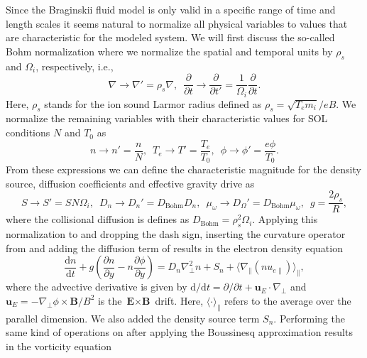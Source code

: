 Since the Braginskii fluid model is only valid in a specific range of time and length scales it seems natural to normalize all physical variables to values that are characteristic for the modeled system. We will first discuss the so-called Bohm normalization where we normalize the spatial and temporal units by $\rho_s$ and $\Omega_i$, respectively, i.e.,
\begin{equation}
	\nabla \rightarrow \nabla' = \rho_s\nabla, \,\,\, \frac{\partial}{\partial t} \rightarrow \frac{\partial}{\partial t'} = \frac{1}{\Omega_i}\frac{\partial}{\partial t}.
\end{equation}
Here, $\rho_s$ stands for the ion sound Larmor radius defined as $\rho_s = \sqrt{T_e m_i}/eB$.
We normalize the remaining variables with their characteristic values for SOL conditions $N$ and $T_0$ as
\begin{equation}
	n \rightarrow n' = \frac{n}{N},\,\,\, T_e \rightarrow T' = \frac{T_e}{T_0},\,\,\,\phi \rightarrow \phi' = \frac{e\phi}{T_0}. 
\end{equation}
From these expressions we can define the characteristic magnitude for the density source, diffusion coefficients and effective gravity drive as
\begin{equation}
	S\rightarrow S' = SN\Omega_i,\,\,\,D_n\rightarrow D_n' = D_{\textrm{Bohm}}D_n,\,\,\,\mu_\omega\rightarrow D_\Omega' = D_{\textrm{Bohm}}\mu_\omega,\,\,\,g = \frac{2\rho_s}{R},
\end{equation} 
where the collisional diffusion is defines as $D_{\textrm{Bohm}}= \rho_s^2\Omega_i$. Applying this normalization to  and dropping the dash sign, inserting the curvature operator from  and adding the diffusion term of  results in the electron density equation
\begin{equation}
	\frac{\mathrm{d}n}{\mathrm{d}t} + g \left(\frac{\partial n}{\partial y} - n\frac{\partial\phi}{\partial y}\right) = D_n \nabla_\perp^2 n + S_n + \Bigg \langle \nabla_\parallel \left(n{u}_{e\parallel} \right)\Bigg \rangle_\parallel,
\end{equation}
where the advective derivative is given by $\mathrm{d}/\mathrm{d}t = \partial/\partial t + \textbf{u}_E\cdot \nabla_\perp$ and $\textbf{u}_E = - \nabla_\perp\phi\times\textbf{B}/B^2$ is the $\textbf{E}\times\textbf{B}$ drift. Here, $\langle\cdot\rangle_\parallel$ refers to the average over the parallel dimension. We also added the density source term $S_n$. Performing the same kind of operations on  after applying the Boussinesq approximation results in the vorticity equation
